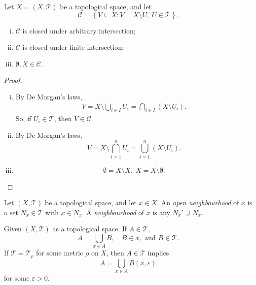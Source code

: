 \begin{lemma}
	Let $X = (X, \mathcal T)$ be a topological space, and let
	$$
	\mathcal C = \left\{ V \subseteq X : V = X \setminus U , \; U \in \mathcal T\right\}.
	$$
	\begin{enumerate}[(i)]
		\item $\mathcal C$ is closed under arbitrary intersection;
		\item $\mathcal C$ is closed under finite intersection;
		\item $\emptyset, X \in \mathcal C$.
	\end{enumerate}
\end{lemma}

\begin{proof} \
	\begin{enumerate}[(i).]
		\item By De Morgan's laws,
		$$
		\begin{aligned}
			V = X \setminus \bigcup_{i \in I} U_i = \bigcap_{i \in I} (X \setminus U_i).
		\end{aligned}
		$$
		So, if $U_i \in \mathcal T$, then $V \in \mathcal C$.
		
		\item By De Morgan's laws,
			$$
			V = X \setminus \bigcap_{i = 1}^n U_i = \bigcup_{i = 1}^n (X \setminus U_i).
			$$
			
		\item 
			$$
			\emptyset = X \setminus X, \; X = X \setminus \emptyset.
			$$
	\end{enumerate}
\end{proof}


\begin{definition}
	Let $(X, \mathcal T)$ be a topological space, and let $x \in X$. An \textit{open neighbourhood} of $x$ is a set $N_x \in \mathcal T$ with $x \in N_x$. A \textit{neighbourhood} of $x$ is any $N_x' \supseteq N_x$.
\end{definition}


\begin{note}
	Given $(X, \mathcal T)$ as a topological space. If $A \in \mathcal T$,
	$$
	A = \bigcup_{x \in A} B, \quad B \in x, \text{ and } B \in \mathcal T.
	$$
	If $\mathcal T = \mathcal T_\rho$ for some metric $\rho$ on $X$, then $A \in \mathcal T$ implies
	$$
	A= \bigcup_{x \in A} B(x, \varepsilon)
	$$
	for some $\varepsilon > 0$.
\end{note}


